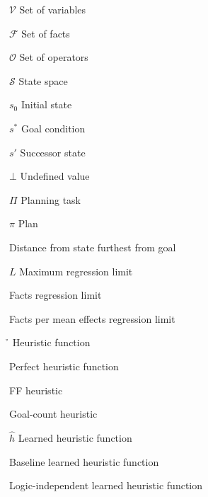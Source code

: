 \begin{listofsymbols}{\hgc}
    \item[$\mathcal{V}$] Set of variables
    \item[$\mathcal{F}$] Set of facts
    \item[$\mathcal{O}$] Set of operators
    \item[$\mathcal{S}$] State space
    \item[$s_0$] Initial state
    \item[$s^*$] Goal condition
    \item[$s'$] Successor state
    \item[$\bot$] Undefined value
    \item[$\Pi$] Planning task
    \item[$\pi$] Plan
    \item[\ssdiameter] Distance from state furthest from goal
    \item[$L$] Maximum regression limit
    \item[\facts] Facts regression limit
    \item[\meanfx] Facts per mean effects regression limit
    \item[\h] Heuristic function
    \item[\hstar] Perfect heuristic function
    \item[\hff] FF heuristic
    \item[\hgc] Goal-count heuristic
    \item[$\hat h$] Learned heuristic function
    \item[\hnnbase] Baseline learned heuristic function
    \item[\hnnnomutex] Logic-independent learned heuristic function
\end{listofsymbols}
